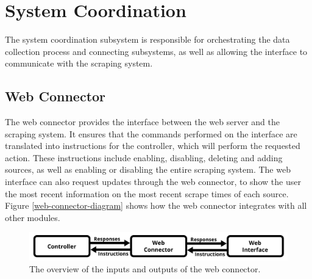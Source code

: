\documentclass{l4proj}
\begin{document}
\section{System Coordination}
The system coordination subsystem is responsible for orchestrating the data collection process and connecting subsystems, as well as allowing the interface to communicate with the scraping system.
\subsection{Web Connector}
The web connector provides the interface between the web server and the scraping system. It ensures that the commands performed on the interface are translated into instructions for the controller, which will perform the requested action. These instructions include enabling, disabling, deleting and adding sources, as well as enabling or disabling the entire scraping system. The web interface can also request updates through the web connector, to show the user the most recent information on the most recent scrape times of each source. Figure \ref{web-connector-diagram} shows how the web connector integrates with all other modules.
 \begin{figure}[h]
\centering
\includegraphics[width=\textwidth]{images/Web-connector-diagram.png}
\caption{The overview of the inputs and outputs of the web connector.}
\label{fig:web-connector-diagram}
\end{figure}
\end{document}
